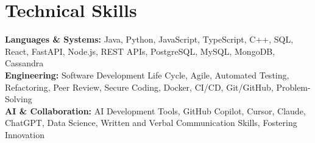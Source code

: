 \documentclass[letterpaper,11pt]{article}
\begin{document}
\section{Technical Skills}
\begin{itemize}[leftmargin=0.15in, label={}]
  \small{\item{
    \textbf{Languages \& Systems:} Java, Python, JavaScript, TypeScript, C++, SQL, React, FastAPI, Node.js, REST APIs, PostgreSQL, MySQL, MongoDB, Cassandra \\
    \textbf{Engineering:} Software Development Life Cycle, Agile, Automated Testing, Refactoring, Peer Review, Secure Coding, Docker, CI/CD, Git/GitHub, Problem-Solving \\
    \textbf{AI \& Collaboration:} AI Development Tools, GitHub Copilot, Cursor, Claude, ChatGPT, Data Science, Written and Verbal Communication Skills, Fostering Innovation
  }}
\end{itemize}
\end{document}
